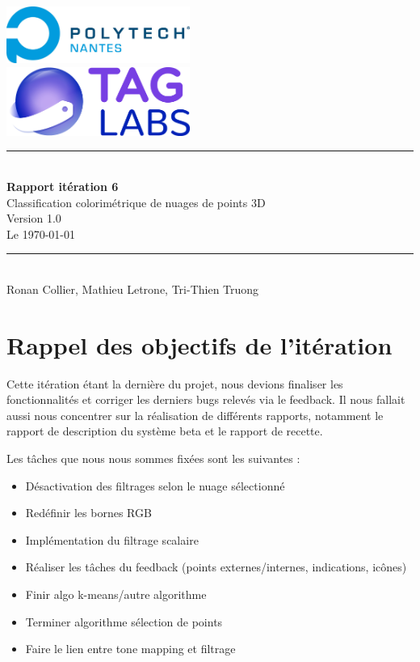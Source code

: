\documentclass[12pt,titlepage,french]{article}
\begin{document}

\begin{titlepage}
\newcommand{\HRule}{\rule{\linewidth}{0.5mm}}
\center

  \includegraphics[width=0.45\textwidth]{../../ressources/img_logos/logo_polytech.png}\\[1cm]

  \includegraphics[width=0.45\textwidth]{../../ressources/img_logos/logo_taglabs.png}


\HRule \\[0.4cm]
{ \huge \bfseries Rapport itération 6\\[0.15cm] }
Classification colorimétrique de nuages de points 3D\\
Version 1.0\\
Le \today \\
\HRule \\[1.5cm]
Ronan Collier,
Mathieu Letrone,
Tri-Thien Truong
\\[1cm]
\end{titlepage}

\tableofcontents %
\newpage
\listoffigures  %
\newpage

\section{Rappel des objectifs de l'itération}
Cette itération étant la dernière du projet, nous devions finaliser les fonctionnalités et corriger les derniers bugs relevés via le feedback. Il nous fallait aussi nous concentrer sur la réalisation de différents rapports, notamment le rapport de description du système beta et le rapport de recette.

Les tâches que nous nous sommes fixées sont les suivantes :

\begin{itemize}
    \item Désactivation des filtrages selon le nuage sélectionné
    \item Redéfinir les bornes RGB
    \item Implémentation du filtrage scalaire
    \item Réaliser les tâches du feedback (points externes/internes, indications, icônes)
    \item Finir algo k-means/autre algorithme
    \item Terminer algorithme sélection de points
    \item Faire le lien entre tone mapping et filtrage
\end{itemize}
\end{document}

